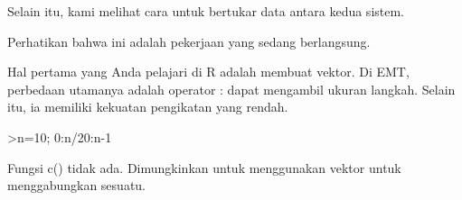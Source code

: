 \documentclass[a4paper,10pt]{article}
\begin{document}
\begin{eulernotebook}
\begin{eulercomment}
\begin{eulercomment}
\begin{eulercomment}
\begin{eulercomment}
\begin{eulercomment}
Selain itu, kami melihat cara untuk bertukar data antara kedua sistem.
\end{eulercomment}
\begin{eulercomment}
Perhatikan bahwa ini adalah pekerjaan yang sedang berlangsung.
\end{eulercomment}
\begin{eulercomment}
Hal pertama yang Anda pelajari di R adalah membuat vektor. Di EMT,
perbedaan utamanya adalah operator : dapat mengambil ukuran langkah.
Selain itu, ia memiliki kekuatan pengikatan yang rendah.
\end{eulercomment}
\begin{eulerprompt}
>n=10; 0:n/20:n-1
\end{eulerprompt}
\begin{euleroutput}
  [0,  0.5,  1,  1.5,  2,  2.5,  3,  3.5,  4,  4.5,  5,  5.5,  6,  6.5,
  7,  7.5,  8,  8.5,  9]
\end{euleroutput}
\begin{eulercomment}
Fungsi c() tidak ada. Dimungkinkan untuk menggunakan vektor untuk
menggabungkan sesuatu.


\end{eulercomment}
\end{eulercomment}
\end{eulercomment}
\end{eulercomment}
\end{eulercomment}
\end{eulernotebook}
\end{document}
